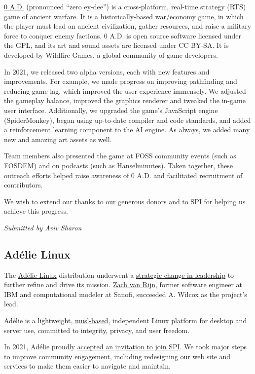 \documentclass[a4paper]{report}
\begin{document}
\href{https://play0ad.com/}{0 A.D.} (pronounced ``zero ey-dee'') is a cross-platform, real-time strategy (RTS) game of ancient warfare. It is a historically-based war/economy game, in which the player must lead an ancient civilization, gather resources, and raise a military force to conquer enemy factions. 0 A.D. is open source software licensed under the GPL, and its art and sound assets are licensed under CC BY-SA. It is developed by Wildfire Games, a global community of game developers.

In 2021, we released two alpha versions, each with new features and improvements. For example, we made progress on improving pathfinding and reducing game lag, which improved the user experience immensely. We adjusted the gameplay balance, improved the graphics renderer and tweaked the in-game user interface. Additionally, we upgraded the game's JavaScript engine (SpiderMonkey), began using up-to-date compiler and code standards, and added a reinforcement learning component to the AI engine. As always, we added many new and amazing art assets as well.

Team members also presented the game at FOSS community events (such as FOSDEM) and on podcasts (such as Hanselminutes). Taken together, these outreach efforts helped raise awareness of 0 A.D. and facilitated recruitment of contributors.

We wish to extend our thanks to our generous donors and to SPI for helping us achieve this progress.

{\em Submitted by Aviv Sharon}

\subsection{Adélie Linux}

The \href{https://www.adelielinux.org/}{Adélie Linux} distribution underwent a \href{https://blog.adelielinux.org/2021/07/22/2021-state-of-the-adelie-linux-distribution/}{strategic change in leadership} to further refine and drive its mission.  \href{https://zv.io/about/}{Zach van Rijn}, former software engineer at IBM and computational modeler at Sanofi, succeeded A. Wilcox as the project's lead.

Adélie is a lightweight, \href{https://musl.libc.org/}{{musl-based}}, independent Linux platform for desktop and server use, committed to integrity, privacy, and user freedom.

In 2021, Adélie proudly \href{https://www.spi-inc.org/projects/adelielinux/}{accepted an invitation to join SPI}. We took major steps to improve community engagement, including redesigning our web site and services to make them easier to navigate and maintain.
\end{document}
